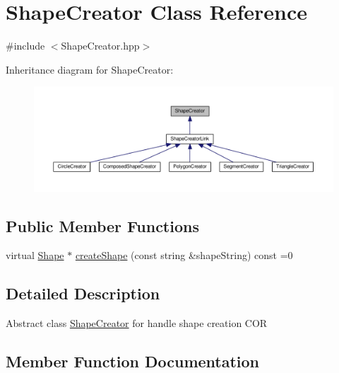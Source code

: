 \hypertarget{class_shape_creator}{}\section{Shape\+Creator Class Reference}
\label{class_shape_creator}


{\ttfamily \#include $<$Shape\+Creator.\+hpp$>$}



Inheritance diagram for Shape\+Creator\+:\nopagebreak
\begin{figure}[H]
\begin{center}
\leavevmode
\includegraphics[width=350pt]{class_shape_creator__inherit__graph}
\end{center}
\end{figure}
\subsection*{Public Member Functions}
\begin{DoxyCompactItemize}
\item 
virtual \hyperlink{class_shape}{Shape} $\ast$ \hyperlink{class_shape_creator_a515bc403dc9de02b126d52480ba6ee78}{create\+Shape} (const string \&shape\+String) const =0
\end{DoxyCompactItemize}


\subsection{Detailed Description}
Abstract class \hyperlink{class_shape_creator}{Shape\+Creator} for handle shape creation C\+OR 

\subsection{Member Function Documentation}
\hypertarget{class_shape_creator_a515bc403dc9de02b126d52480ba6ee78}{}\label{class_shape_creator_a515bc403dc9de02b126d52480ba6ee78} 
